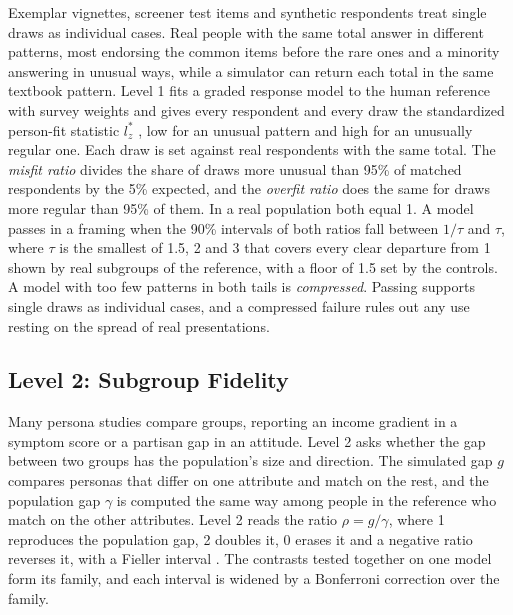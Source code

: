 Exemplar vignettes, screener test items and synthetic respondents treat single draws as individual cases.
Real people with the same total answer in different patterns, most endorsing the common items before the rare ones and a minority answering in unusual ways, while a simulator can return each total in the same textbook pattern.
Level 1 fits a graded response model \citep{samejima1969graded} to the human reference with survey weights and gives every respondent and every draw the standardized person-fit statistic $l_z^*$ \citep{drasgow1985appropriateness,snijders2001personfit,sinharay2016personfit}, low for an unusual pattern and high for an unusually regular one.
Each draw is set against real respondents with the same total.
The \emph{misfit ratio} divides the share of draws more unusual than 95\% of matched respondents by the 5\% expected, and the \emph{overfit ratio} does the same for draws more regular than 95\% of them.
In a real population both equal 1.
A model passes in a framing when the 90\% intervals of both ratios fall between $1/\tau$ and $\tau$, where $\tau$ is the smallest of 1.5, 2 and 3 that covers every clear departure from 1 shown by real subgroups of the reference, with a floor of 1.5 set by the controls.
A model with too few patterns in both tails is \emph{compressed}.
Passing supports single draws as individual cases, and a compressed failure rules out any use resting on the spread of real presentations.

\subsection{Level 2: Subgroup Fidelity}
\label{sec:l2-method}

Many persona studies compare groups, reporting an income gradient in a symptom score or a partisan gap in an attitude.
Level 2 asks whether the gap between two groups has the population's size and direction.
The simulated gap $g$ compares personas that differ on one attribute and match on the rest, and the population gap $\gamma$ is computed the same way among people in the reference who match on the other attributes.
Level 2 reads the ratio $\rho = g/\gamma$, where 1 reproduces the population gap, 2 doubles it, 0 erases it and a negative ratio reverses it, with a Fieller interval \citep{fieller1954interval}.
The contrasts tested together on one model form its family, and each interval is widened by a Bonferroni correction over the family.

